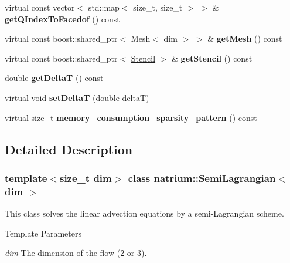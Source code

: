\begin{DoxyCompactItemize}
\item 
\hypertarget{classnatrium_1_1SemiLagrangian_aa4489b0521eac87a93119f1f02459722}{
virtual const vector$<$ std::map$<$ size\_\-t, size\_\-t $>$ $>$ \& {\bfseries getQIndexToFacedof} () const }
\label{classnatrium_1_1SemiLagrangian_aa4489b0521eac87a93119f1f02459722}

\item 
\hypertarget{classnatrium_1_1SemiLagrangian_ac7bd1619acea6f079a7b3151a3c5a3af}{
virtual const boost::shared\_\-ptr$<$ Mesh$<$ dim $>$ $>$ \& {\bfseries getMesh} () const }
\label{classnatrium_1_1SemiLagrangian_ac7bd1619acea6f079a7b3151a3c5a3af}

\item 
\hypertarget{classnatrium_1_1SemiLagrangian_aaf58cb3aa2282de0cee86cc7dd3d7707}{
virtual const boost::shared\_\-ptr$<$ \hyperlink{classnatrium_1_1Stencil}{Stencil} $>$ \& {\bfseries getStencil} () const }
\label{classnatrium_1_1SemiLagrangian_aaf58cb3aa2282de0cee86cc7dd3d7707}

\item 
\hypertarget{classnatrium_1_1SemiLagrangian_ab7a610fbe5599e729230438af1dff2a0}{
double {\bfseries getDeltaT} () const }
\label{classnatrium_1_1SemiLagrangian_ab7a610fbe5599e729230438af1dff2a0}

\item 
\hypertarget{classnatrium_1_1SemiLagrangian_abd17b628b89c43303d067c0a4e4d0bf1}{
virtual void {\bfseries setDeltaT} (double deltaT)}
\label{classnatrium_1_1SemiLagrangian_abd17b628b89c43303d067c0a4e4d0bf1}

\item 
\hypertarget{classnatrium_1_1SemiLagrangian_ac447ccd4c5b945da503cd57f8072db81}{
virtual size\_\-t {\bfseries memory\_\-consumption\_\-sparsity\_\-pattern} () const }
\label{classnatrium_1_1SemiLagrangian_ac447ccd4c5b945da503cd57f8072db81}

\end{DoxyCompactItemize}


\subsection{Detailed Description}
\subsubsection*{template$<$size\_\-t dim$>$ class natrium::SemiLagrangian$<$ dim $>$}

This class solves the linear advection equations by a semi-\/Lagrangian scheme. 
\begin{DoxyTemplParams}{Template Parameters}
\item[{\em dim}]The dimension of the flow (2 or 3). \end{DoxyTemplParams}


